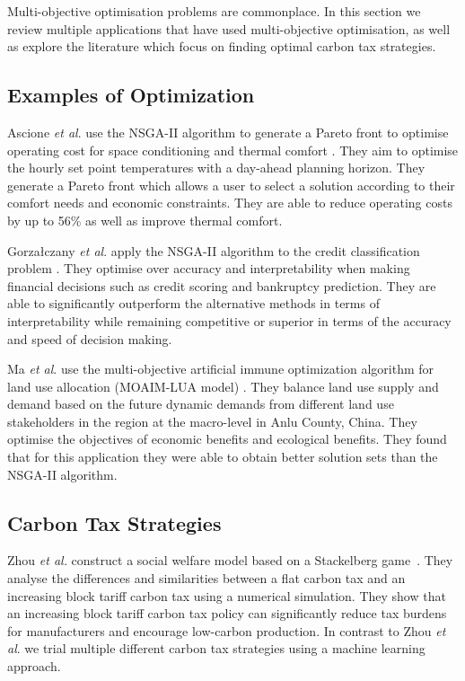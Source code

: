 \documentclass[sigconf]{acmart}
\begin{document}
Multi-objective optimisation problems are commonplace. In this section we review multiple applications that have used multi-objective optimisation, as well as explore the literature which focus on finding optimal carbon tax strategies.

\subsection{Examples of Optimization}

Ascione  \textit{et al}. use the NSGA-II algorithm to generate a Pareto front to optimise operating cost for space conditioning and thermal comfort \cite{Ascione2016}. They aim to optimise the hourly set point temperatures with a day-ahead planning horizon. They generate a Pareto front which allows a user to select a solution according to their comfort needs and economic constraints. They are able to reduce operating costs by up to 56\% as well as improve thermal comfort.

Gorza\l{}czany \textit{et al}. apply the NSGA-II algorithm to the credit classification problem \cite{Gorzaczany2016}. They optimise over accuracy and interpretability when making financial decisions such as credit scoring and bankruptcy prediction. They are able to significantly outperform the alternative methods in terms of interpretability while remaining competitive or superior in terms of the accuracy and speed of decision making.

Ma \textit{et al}. use the multi-objective artificial immune optimization algorithm for land use allocation (MOAIM-LUA model) \cite{Ma2015}. They balance land use supply and demand based on the future dynamic demands from different land use stakeholders in the region at the macro-level in Anlu County, China. They optimise the objectives of economic benefits and ecological benefits. They found that for this application they were able to obtain better solution sets than the NSGA-II algorithm.


\subsection{Carbon Tax Strategies}


Zhou \textit{et al.} construct a social welfare model based on a Stackelberg game~\cite{Zhou2019}. They analyse the differences and similarities between a flat carbon tax and an increasing block tariff carbon tax using a numerical simulation. They show that an increasing block tariff carbon tax policy can significantly reduce tax burdens for manufacturers and encourage low-carbon production. In contrast to Zhou \textit{et al}. we trial multiple different carbon tax strategies using a machine learning approach. 
\end{document}

